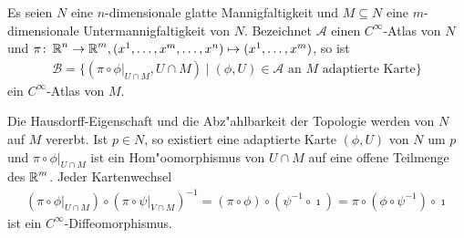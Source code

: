 \begin{Dfn}[Untermannigfaltigkeit]
\begin{center}
\end{center}

\end{Dfn}

\begin{Lemma}\label{lemma-1-5}
  Es seien $N$ eine $n$-dimensionale glatte Mannigfaltigkeit und $M \subseteq N$ eine $m$-dimensionale Untermannigfaltigkeit von $N$. Bezeichnet $\mathcal A$ einen $C^{\infty}$-Atlas von $N$ und $\pi \colon \operatorname{\mathbb{R}}^n \to \operatorname{\mathbb{R}}^m, (x^1, \ldots, x^m,\ldots,x^n) \mapsto (x^1, \ldots, x^m)$, so ist
  \begin{align*}
    \mathcal B = \{(\pi \circ \phi|_{U \cap M},U\cap M) \mid (\phi, U) \in \mathcal A \text{ an } M \text{ adaptierte Karte}\}
  \end{align*}
  ein $C^{\infty}$-Atlas von $M$.
\end{Lemma}

\begin{bew}
Die Hausdorff-Eigenschaft und die Abz"ahlbarkeit der Topologie werden von $N$ auf $M$ vererbt.
Ist $p \in N$, so existiert eine adaptierte Karte $(\phi,U)$ von $N$ um $p$ und $\pi \circ \phi|_{U \cap M}$ ist ein Hom"oomorphismus von $U \cap M$ auf eine offene Teilmenge des $\operatorname{\mathbb{R}}^m$. Jeder Kartenwechsel
\begin{align*}
	(\pi \circ \phi|_{U \cap M}) \circ (\pi \circ \psi|_{V \cap M})^{-1} = (\pi \circ \phi) \circ (\psi^{-1} \circ \imath) = \pi \circ (\phi \circ \psi^{-1}) \circ \imath
\end{align*}
ist ein $C^{\infty}$-Diffeomorphismus.
\end{bew}

